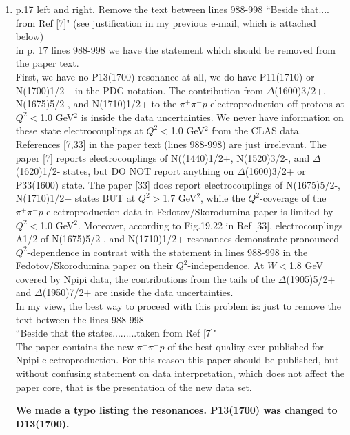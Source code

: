 \documentclass[,superscriptaddress,showpacs,amssymb,amsmath,amsfonts,linenumbers,article]{revtex4-1}
\begin{document}
\begin{enumerate}
\item p.17 left and right. Remove the text between lines 988-998 ``Beside that.... from Ref [7]" (see justification in my previous e-mail, which is attached below)\\[0.5cm]


in p. 17 lines 988-998 we have the statement which should be removed from the paper text.\\[0.5cm]

First, we have no P13(1700) resonance at all, we do have P11(1710) or N(1700)1/2+ in the PDG notation. The contribution from $\Delta$(1600)3/2+, N(1675)5/2-, and N(1710)1/2+ to the $\pi^+\pi^-p$ electroproduction off protons at $Q^2<$1.0 GeV$^2$ is inside the data uncertainties. We never have information on these state electrocouplings at $Q^2<$1.0 GeV$^2$  from the CLAS data. References [7,33] in the paper text (lines 988-998) are just irrelevant. The paper [7] reports electrocouplings of N((1440)1/2+, N(1520)3/2-, and $\Delta$(1620)1/2- states, but DO NOT report anything on $\Delta$(1600)3/2+ or P33(1600) state. The paper [33] does report electrocouplings of N(1675)5/2-, N(1710)1/2+ states BUT at $Q^2>$1.7 GeV$^2$, while the $Q^2$-coverage of the $\pi^+\pi^-p$ electroproduction data in Fedotov/Skorodumina paper is limited by $Q^2<$1.0 GeV$^2$. Moreover, according to Fig.19,22 in Ref [33], electrocouplings A1/2 of N(1675)5/2-, and N(1710)1/2+ resonances demonstrate pronounced $Q^2$-dependence in contrast with the statement in lines 988-998 in the Fedotov/Skorodumina paper on their $Q^2$-independence. At $W<$1.8 GeV covered by Npipi data, the contributions from the tails of the $\Delta$(1905)5/2+ and $\Delta$(1950)7/2+ are inside the data uncertainties.\\[0.5cm]

In my view, the best way to proceed with this problem is: just to remove the text between the lines 988-998\\[0.5cm]

``Beside that the states.........taken from Ref [7]"\\[0.5cm]

The paper contains the new $\pi^+\pi^-p$ of the best quality ever published for Npipi electroproduction. For this reason this paper should be published, but without confusing statement on data interpretation, which does not affect the paper core, that is the presentation of the new data set.\\[0.5cm]

{\bf We made a typo listing the resonances. P13(1700) was changed to D13(1700). 

}
\end{enumerate}
\end{document}

